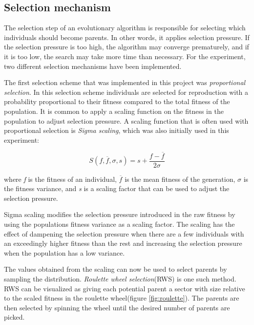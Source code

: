 \subsection{Selection mechanism}
The selection step of an evolutionary algorithm is responsible for selecting which individuals should become parents.
In other words, it applies selection pressure.
If the selection pressure is too high, the algorithm may converge prematurely, and if it is too low, the search may take more time than necessary.
For the experiment, two different selection mechanisms have been implemented.

The first selection scheme that was implemented in this project was \emph{proportional selection}.
In this selection scheme individuals are selected for reproduction with a probability proportional to their fitness compared to the total fitness of the population.
It is common to apply a scaling function on the fitness in the population to adjust selection pressure.
A scaling function that is often used with proportional selection is \emph{Sigma scaling}\cite{goh_sexual_2003}, which was also initially used in this experiment:

\begin{equation}
S(f, \overline{f}, \sigma, s) = s + \frac{f - \overline{f} }{2\sigma}
\end{equation}

where \emph{f} is the fitness of an individual, $\overline{f}$ is the mean fitness of the generation, $\sigma$ is the fitness variance, and \emph{s} is a scaling factor that can be used to adjust the selection pressure.

Sigma scaling modifies the selection pressure introduced in the raw fitness by using the populations fitness variance as a scaling factor.
The scaling has the effect of dampening the selection pressure when there are a few individuals with an exceedingly higher fitness than the rest and increasing the selection pressure when the population has a low variance.

The values obtained from the scaling can now be used to select parents by sampling the distribution.
\emph{Roulette wheel selection}(RWS)\cite{goh_sexual_2003}  is one such method.
RWS can be visualized as giving each potential parent a sector with size relative to the scaled fitness in the roulette wheel(figure \ref{fig:roulette}).
The parents are then selected by spinning the wheel until the desired number of parents are picked.

